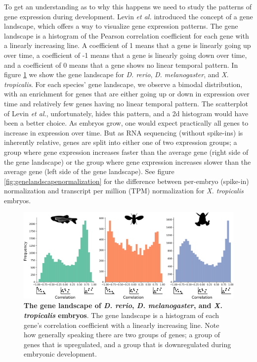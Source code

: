 To get an understanding as to why this happens we need to study the patterns of gene expression during development. Levin \textit{et al.} introduced the concept of a gene landscape, which offers a way to visualize gene expression patterns. The gene landscape is a histogram of the Pearson correlation coefficient for each gene with a linearly increasing line. A coefficient of 1 means that a gene is linearly going up over time, a coefficient of -1 means that a gene is linearly going down over time, and a coefficient of 0 means that a gene shows no linear temporal pattern. In figure \ref{fig:genelandscape} we show the gene landscape for \textit{D. rerio}, \textit{D. melanogaster}, and \textit{X. tropicalis}. For each species' gene landscape, we observe a bimodal distribution, with an enrichment for genes that are either going up or down in expression over time and relatively few genes having no linear temporal pattern. The scatterplot of Levin \textit{et al.}, unfortunately, hides this pattern, and a 2d histogram would have been a better choice. As embryos grow, one would expect practically all genes to increase in expression over time. But as RNA sequencing (without spike-ins) is inherently relative, genes are split into either one of two expression groups; a group where gene expression increases faster than the average gene (right side of the gene landscape) or the group where gene expression increases slower than the average gene (left side of the gene landscape). See figure \ref{fig:genelandscapenormalization} for the difference between per-embryo (spike-in) normalization and transcript per million (TPM) normalization for \textit{X. tropicalis} embryos.

\begin{figure}[H]
    \includegraphics[width=\linewidth]{ch.hourglass/images/gene_landscape.png}
    \caption{\textbf{The gene landscape of \textit{D. rerio}, \textit{D. melanogaster}, and \textit{X. tropicalis} embryos}. The gene landscape is a histogram of each gene's correlation coefficient with a linearly increasing line. Note how generally speaking there are two groups of genes; a group of genes that is upregulated, and a group that is downregulated during embryonic development.}
    \label{fig:genelandscape}
\end{figure}

